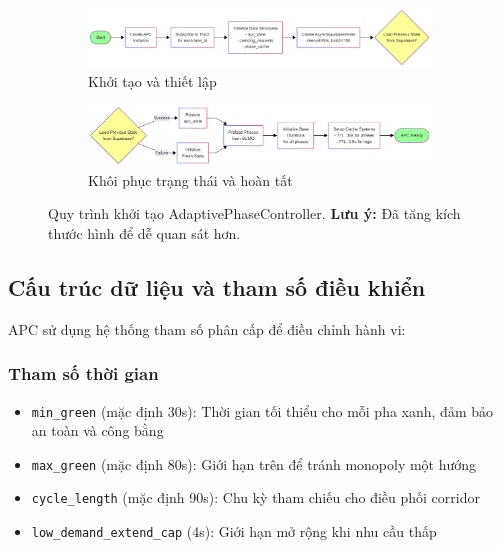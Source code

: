 \begin{figure}[H]
    \centering
    \begin{subfigure}[b]{0.65\textwidth}
        \centering
        \includegraphics[width=\textwidth]{Untitled diagram _ Mermaid Chart-2025-08-21-084042.png}
        \caption{Khởi tạo và thiết lập}
    \end{subfigure}
    \hfill
    \begin{subfigure}[b]{0.65\textwidth}
        \centering
        \includegraphics[width=\textwidth]{Untitled diagram _ Mermaid Chart-2025-08-21-084132.png}
        \caption{Khôi phục trạng thái và hoàn tất}
    \end{subfigure}
    \caption{Quy trình khởi tạo AdaptivePhaseController. \newline \textbf{Lưu ý:} Đã tăng kích thước hình để dễ quan sát hơn.}
    \label{fig:apc_init_flow}
\end{figure}
\subsection{Cấu trúc dữ liệu và tham số điều khiển}

APC sử dụng hệ thống tham số phân cấp để điều chỉnh hành vi:

\subsubsection{Tham số thời gian}
\begin{itemize}
    \item \texttt{min\_green} (mặc định 30s): Thời gian tối thiểu cho mỗi pha xanh, đảm bảo an toàn và công bằng
    \item \texttt{max\_green} (mặc định 80s): Giới hạn trên để tránh monopoly một hướng
    \item \texttt{cycle\_length} (mặc định 90s): Chu kỳ tham chiếu cho điều phối corridor
    \item \texttt{low\_demand\_extend\_cap} (4s): Giới hạn mở rộng khi nhu cầu thấp
\end{itemize}

